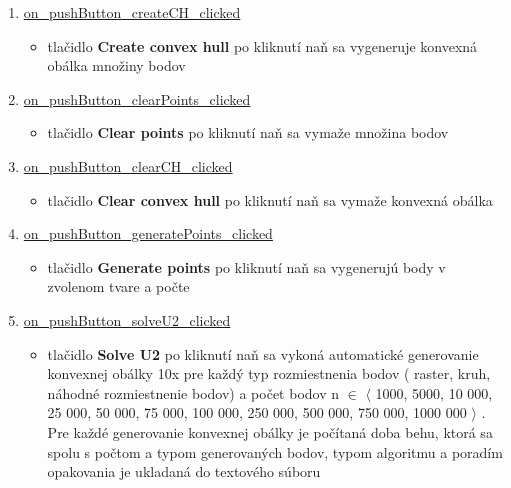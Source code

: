 \documentclass[12pt]{article}
\begin{document}
\begin{enumerate}
\item[] \underline{on\_pushButton\_createCH\_clicked}
\begin{itemize}
\item tlačidlo \textbf{Create convex hull} po kliknutí naň sa vygeneruje konvexná obálka množiny bodov
\end{itemize}

\item[] \underline{on\_pushButton\_clearPoints\_clicked}
\begin{itemize}
\item tlačidlo \textbf{Clear points}  po kliknutí naň sa vymaže množina bodov
\end{itemize}

\item[] \underline{on\_pushButton\_clearCH\_clicked}
\begin{itemize}
\item tlačidlo \textbf{Clear convex hull}  po kliknutí naň sa vymaže konvexná obálka
\end{itemize}

\item[] \underline{on\_pushButton\_generatePoints\_clicked}
\begin{itemize}
\item tlačidlo \textbf{Generate points}  po kliknutí naň sa vygenerujú body v zvolenom tvare a počte
\end{itemize}

\item[] \underline{on\_pushButton\_solveU2\_clicked}
\begin{itemize}
\item tlačidlo \textbf{Solve U2}  po kliknutí naň sa vykoná automatické generovanie konvexnej obálky 10x pre každý typ rozmiestnenia bodov ( raster, kruh, náhodné rozmiestnenie bodov) a počet bodov n $\in$ $\langle$ 1000, 5000, 10 000, 25 000, 50 000, 75 000, 100 000, 250 000, 500 000, 750 000, 1000 000 $\rangle$ . Pre každé generovanie konvexnej obálky je počítaná doba behu, ktorá sa spolu s počtom a typom generovaných bodov, typom algoritmu a poradím opakovania je ukladaná do textového súboru
\end{itemize}

\end{enumerate}


\clearpage
\end{document}
